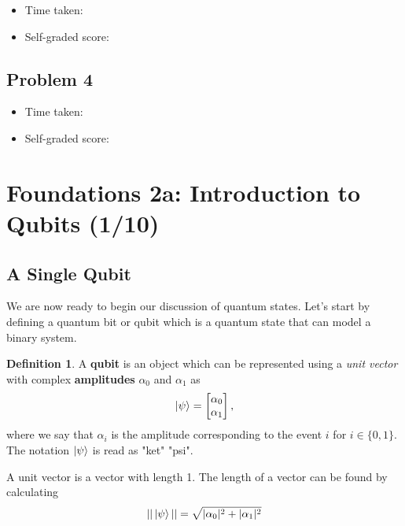 \documentclass[letterpaper, 12pt]{article}
\newcommand{\1}{\mathds{1}}	%
\theoremstyle{definition}
\newtheorem{definition}[theorem]{Definition}
\begin{document}
\begin{itemize}
    \item Time taken: 
    \item Self-graded score: 
\end{itemize}

\subsection{Problem 4}

\begin{itemize}
    \item Time taken: 
    \item Self-graded score: 
\end{itemize}


\newpage 



\section[Foundations 2a -- {\it Introduction to Qubits}]{Foundations 2a: Introduction to Qubits (1/10)}

\subsection{A Single Qubit}

We are now ready to begin our discussion of quantum states. Let's start by defining a quantum bit or qubit which is a quantum state that can model a binary system. 

\begin{definition}
    A \textbf{qubit} is an object which can be represented using a \textit{unit vector} with complex \textbf{amplitudes} $\alpha_0$ and $\alpha_1$ as 
    \begin{equation}\label{eq:notes-1-3-qubit}
        \ket{\psi} = \begin{bmatrix}
            \alpha_0 \\ \alpha_1
        \end{bmatrix},
    \end{equation}
    where we say that $\alpha_i$ is the amplitude corresponding to the event $i$ for $i \in \{0, 1\}$. The notation $\ket{\psi}$ is read as "ket" "psi". 
\end{definition}

A unit vector is a vector with length 1. The length of a vector can be found by calculating 
\begin{equation}
    ||\ket{\psi}|| = \sqrt{|\alpha_0|^2 + |\alpha_1|^2}
\end{equation}
\end{document}
